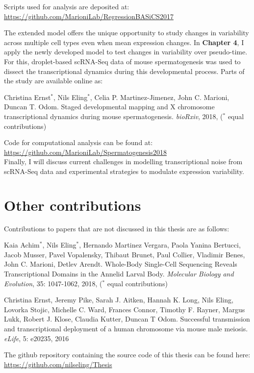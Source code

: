 Scripts used for analysis are deposited at:\\
\url{https://github.com/MarioniLab/RegressionBASiCS2017}

\newpage

The extended model offers the unique opportunity to study changes in variability across multiple cell types even when mean expression changes. 
In \textbf{Chapter 4}, I apply the newly developed model to test changes in variability over pseudo-time. 
For this, droplet-based scRNA-Seq data of mouse spermatogenesis was used to dissect the transcriptional dynamics during this developmental process. 
Parts of the study are available online as:

\begin{Abstract}
\hspace{-5mm} Christina Ernst$^\ast$, Nils Eling$^\ast$, Celia P. Martinez-Jimenez, John C. Marioni, Duncan T. Odom. 
Staged developmental mapping and X chromosome transcriptional dynamics during mouse spermatogenesis. \emph{bioRxiv}, 2018, ($^\ast$ equal contributions)
\end{Abstract}

Code for computational analysis can be found at:\\
\url{https://github.com/MarioniLab/Spermatogenesis2018}\\

Finally, I will discuss current challenges in modelling transcriptional noise from scRNA-Seq data and experimental strategies to modulate expression variability.

\section{Other contributions}

Contributions to papers that are not discussed in this thesis are as follows:\\

\begin{Abstract}
\hspace{-5mm} Kaia Achim$^\ast$, Nils Eling$^\ast$, Hernando Martinez Vergara, Paola Yanina Bertucci, Jacob Musser, Pavel Vopalensky, Thibaut Brunet, Paul Collier, Vladimir Benes, John C. Marioni, Detlev Arendt. 
Whole-Body Single-Cell Sequencing Reveals Transcriptional Domains in the Annelid Larval Body. \emph{Molecular Biology and Evolution}, 35: 1047-1062, 2018, ($^\ast$ equal contributions)
\end{Abstract}

\begin{Abstract}
\hspace{-5mm} Christina Ernst, Jeremy Pike, Sarah J. Aitken, Hannah K. Long, Nils Eling, Lovorka Stojic, Michelle C. Ward, Frances Connor, Timothy F. Rayner, Margus Lukk, Robert J. Klose, Claudia Kutter, Duncan T Odom. 
Successful transmission and transcriptional deployment of a human chromosome via mouse male meiosis. \emph{eLife}, 5: e20235, 2016 
\end{Abstract}

The github repository containing the source code of this thesis can be found here:\\
\url{https://github.com/nilseling/Thesis}